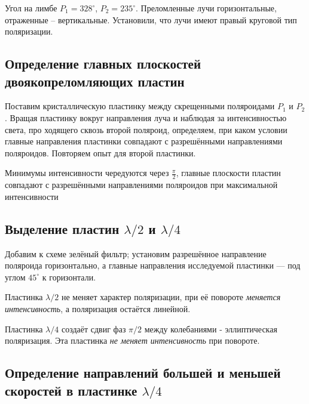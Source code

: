 Угол на лимбе $P_1 = 328^{\circ}$, $P_2 = 235^{\circ}$. Преломленные лучи горизонтальные, отраженные – вертикальные. Установили, что лучи имеют правый
круговой тип поляризации. 

\subsection{Определение главных плоскостей двоякопреломляющих пластин}
Поставим кристаллическую пластинку
между скрещенными поляроидами $P_1$ и $P_2$. Вращая пластинку вокруг направления луча
и наблюдая за интенсивностью света, про
ходящего сквозь второй поляроид, определяем, при
каком условии главные направления пластинки
совпадают с разрешёнными направлениями поляроидов. Повторяем опыт для второй пластинки.

Минимумы интенсивности чередуются через $\frac{\pi}{2}$, главные плоскости пластин совпадают с разрешёнными направлениями поляроидов при максимальной интенсивности

\subsection{Выделение пластин $\lambda/2$ и $\lambda/4$}
Добавим к схеме зелёный фильтр; установим
разрешённое направление поляроида горизонтально, а главные направления исследуемой пластинки — под углом $45^{\circ}$ к горизонтали. 
\par Пластинка $\lambda/2$ не меняет характер поляризации, при её повороте \textit{меняется интенсивность}, а поляризация остаётся линейной. 
\par Пластинка $\lambda/4$ создаёт сдвиг фаз $\pi/2$ между колебаниями - эллиптическая поляризация. Эта пластинка \textit{не меняет интенсивность} при повороте.

\subsection{Определение направлений большей и меньшей скоростей в пластинке $\lambda/4$}

